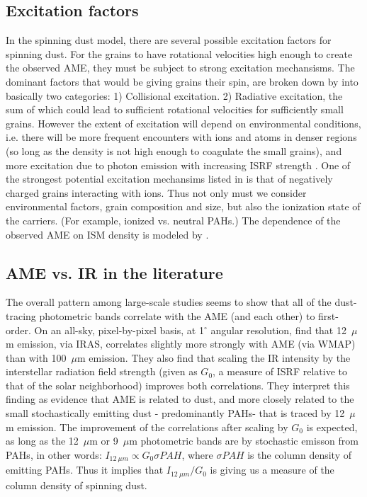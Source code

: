      \subsection{Excitation factors}
       In the spinning dust model, there are several possible excitation factors for spinning dust. For the grains to have rotational velocities high enough to create the observed AME, they must be subject to strong excitation mechansisms. The dominant factors that would be giving grains their spin, are broken down by \cite{draine11} into basically two categories: 1) Collisional excitation. 2) Radiative excitation, the sum of which could lead to sufficient rotational velocities for sufficiently small grains. However the extent of excitation will depend on environmental conditions, i.e. there will be more frequent encounters with ions and atoms in denser regions (so long as the density is not high enough to coagulate the small grains), and more excitation due to photon emission with increasing ISRF strength \citep{ali-haimoud09, ali-haimoud14}. One of the strongest potential excitation mechansims listed in \cite{draine11} is that of negatively charged grains interacting with ions. Thus not only must we consider environmental factors, grain composition and size, but also the ionization state of the carriers. (For example, ionized vs. neutral PAHs.) The dependence of the observed AME on ISM density is modeled by \cite{ali-haimoud10}.

       \subsection{AME vs. IR in the literature}
          The overall pattern among large-scale studies seems to show that all of the dust-tracing photometric bands correlate with the AME (and each other) to first-order.  On an all-sky, pixel-by-pixel basis, at 1$^{\circ}$ angular resolution, \cite{ysard10b} find that 12~$\mu$m emission, via IRAS, correlates slightly more strongly with AME (via WMAP) than with 100~$\mu$m emission.  They also find that scaling the IR intensity by the interstellar radiation field strength (given as $G_{0}$, a measure of ISRF relative to that of the solar neighborhood) improves both correlations. They interpret this finding as evidence that AME is related to dust, and more closely related to the small stochastically emitting dust - predominantly PAHs- that is traced by 12~$\mu$m emission. The improvement of the correlations after scaling by $G_{0}$ is expected, as long as the 12~$\mu$m or 9~$\mu$m photometric bands are by stochastic emisson from PAHs, in other words: $I_{12~\mu{}m} \propto{}G_{0}\sigma{PAH}$, where $\sigma{PAH}$ is the column density of emitting PAHs. Thus it implies that $I_{12~\mu{}m}/G_{0}$ is giving us a measure of the column density of spinning dust.


